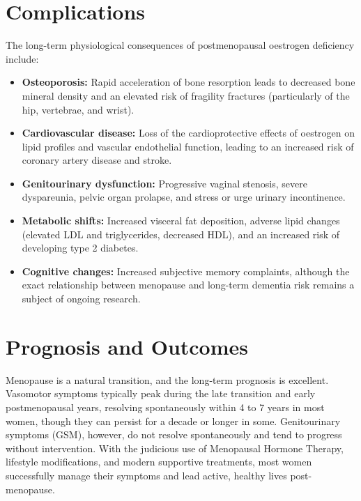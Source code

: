 \section*{Complications}
The long-term physiological consequences of postmenopausal oestrogen deficiency include:
\begin{itemize}
    \item \textbf{Osteoporosis:} Rapid acceleration of bone resorption leads to decreased bone mineral density and an elevated risk of fragility fractures (particularly of the hip, vertebrae, and wrist).
    \item \textbf{Cardiovascular disease:} Loss of the cardioprotective effects of oestrogen on lipid profiles and vascular endothelial function, leading to an increased risk of coronary artery disease and stroke.
    \item \textbf{Genitourinary dysfunction:} Progressive vaginal stenosis, severe dyspareunia, pelvic organ prolapse, and stress or urge urinary incontinence.
    \item \textbf{Metabolic shifts:} Increased visceral fat deposition, adverse lipid changes (elevated LDL and triglycerides, decreased HDL), and an increased risk of developing type 2 diabetes.
    \item \textbf{Cognitive changes:} Increased subjective memory complaints, although the exact relationship between menopause and long-term dementia risk remains a subject of ongoing research.
\end{itemize}

\section*{Prognosis and Outcomes}
Menopause is a natural transition, and the long-term prognosis is excellent. Vasomotor symptoms typically peak during the late transition and early postmenopausal years, resolving spontaneously within 4 to 7 years in most women, though they can persist for a decade or longer in some. Genitourinary symptoms (GSM), however, do not resolve spontaneously and tend to progress without intervention. With the judicious use of Menopausal Hormone Therapy, lifestyle modifications, and modern supportive treatments, most women successfully manage their symptoms and lead active, healthy lives post-menopause.

